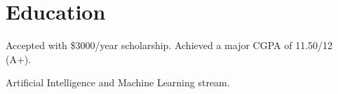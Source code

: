 \section{Education}


Accepted with \$3000/year scholarship. Achieved a major CGPA of 11.50/12 (A+).

Artificial Intelligence and Machine Learning stream.
